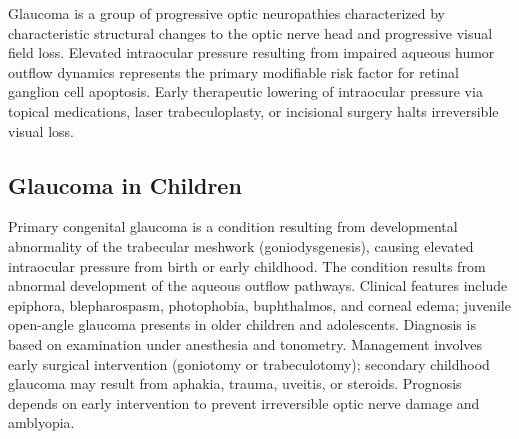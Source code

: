 


Glaucoma is a group of progressive optic neuropathies characterized by characteristic structural changes to the optic nerve head and progressive visual field loss. Elevated intraocular pressure resulting from impaired aqueous humor outflow dynamics represents the primary modifiable risk factor for retinal ganglion cell apoptosis. Early therapeutic lowering of intraocular pressure via topical medications, laser trabeculoplasty, or incisional surgery halts irreversible visual loss.





\label{sec:Glaucoma}

\subsection{Glaucoma in Children}
\label{sec:Glaucoma in Children}
Primary congenital glaucoma is a condition resulting from developmental abnormality of the trabecular meshwork (goniodysgenesis), causing elevated intraocular pressure from birth or early childhood. The condition results from abnormal development of the aqueous outflow pathways. Clinical features include epiphora, blepharospasm, photophobia, buphthalmos, and corneal edema; juvenile open-angle glaucoma presents in older children and adolescents. Diagnosis is based on examination under anesthesia and tonometry. Management involves early surgical intervention (goniotomy or trabeculotomy); secondary childhood glaucoma may result from aphakia, trauma, uveitis, or steroids. Prognosis depends on early intervention to prevent irreversible optic nerve damage and amblyopia.

